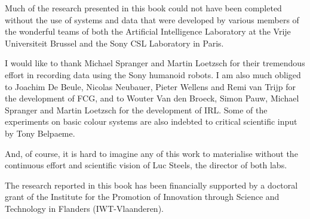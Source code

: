 
Much of the research presented in this book could not have been completed without the use of systems and data that were developed by various members of the wonderful teams of both the Artificial Intelligence Laboratory at the Vrije Universiteit Brussel and the Sony CSL Laboratory in Paris.

I would like to thank Michael Spranger and Martin Loetzsch for their tremendous effort in recording data using the Sony humanoid robots. I am also much obliged to Joachim De Beule, Nicolas Neubauer, Pieter Wellens and Remi van Trijp for the development of FCG, and to Wouter Van den Broeck, Simon Pauw, Michael Spranger and Martin Loetzsch for the development of IRL. Some of the experiments on basic colour systems are also indebted to critical scientific input by Tony Belpaeme. 

And, of course, it is hard to imagine any of this work to materialise without the continuous effort and scientific vision of Luc Steels, the director of both labs.

The research reported in this book has been financially supported by a doctoral grant of the Institute for the Promotion of Innovation through Science and Technology in Flanders (IWT-Vlaanderen).